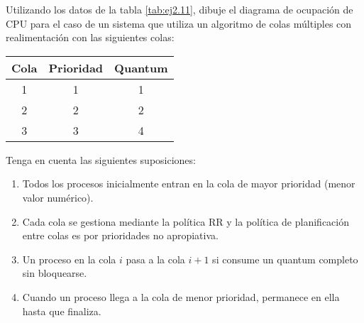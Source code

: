 \begin{ejercicio}\label{ej2.12}
    Utilizando los datos de la tabla \ref{tab:ej2.11}, dibuje el diagrama de ocupación de CPU para el caso de un sistema que utiliza un algoritmo de colas múltiples con realimentación con las siguientes colas:
    \begin{table}[H]
        \centering
        \begin{tabular}{c|c|c}
            Cola & Prioridad & Quantum \\ \hline \hline
            1 & 1 & 1 \\
            2 & 2 & 2 \\
            3 & 3 & 4 \\
        \end{tabular}
    \end{table}

    Tenga en cuenta las siguientes suposiciones:
    \begin{enumerate}
        \item Todos los procesos inicialmente entran en la cola de mayor prioridad (menor valor numérico).
        \item Cada cola se gestiona mediante la política RR y la política de planificación entre colas es por prioridades no apropiativa.
        \item Un proceso en la cola $i$ pasa a la cola $i+1$ si consume un quantum completo sin bloquearse.
        \item Cuando un proceso llega a la cola de menor prioridad, permanece en ella hasta que finaliza.
    \end{enumerate}
    

\end{ejercicio}
